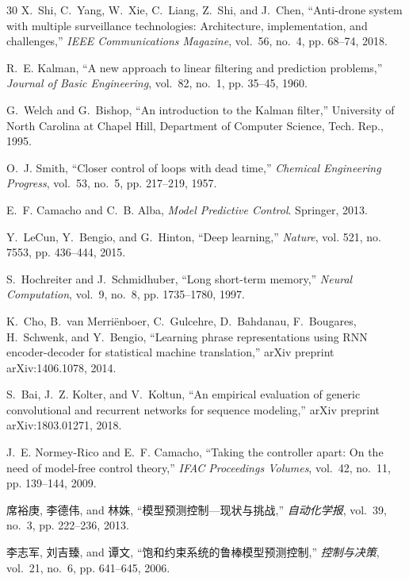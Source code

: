 \documentclass[journal]{IEEEtran}
\begin{document}
\begin{thebibliography}{30}
X.~Shi, C.~Yang, W.~Xie, C.~Liang, Z.~Shi, and J.~Chen, ``Anti-drone system with multiple surveillance technologies: Architecture, implementation, and challenges,'' \emph{IEEE Communications Magazine}, vol.~56, no.~4, pp. 68--74, 2018.

R.~E. Kalman, ``A new approach to linear filtering and prediction problems,'' \emph{Journal of Basic Engineering}, vol.~82, no.~1, pp. 35--45, 1960.

G.~Welch and G.~Bishop, ``An introduction to the Kalman filter,'' University of North Carolina at Chapel Hill, Department of Computer Science, Tech. Rep., 1995.

O.~J. Smith, ``Closer control of loops with dead time,'' \emph{Chemical Engineering Progress}, vol.~53, no.~5, pp. 217--219, 1957.

E.~F. Camacho and C.~B. Alba, \emph{Model Predictive Control}. Springer, 2013.

Y.~LeCun, Y.~Bengio, and G.~Hinton, ``Deep learning,'' \emph{Nature}, vol. 521, no. 7553, pp. 436--444, 2015.

S.~Hochreiter and J.~Schmidhuber, ``Long short-term memory,'' \emph{Neural Computation}, vol.~9, no.~8, pp. 1735--1780, 1997.

K.~Cho, B.~van Merriënboer, C.~Gulcehre, D.~Bahdanau, F.~Bougares, H.~Schwenk, and Y.~Bengio, ``Learning phrase representations using RNN encoder-decoder for statistical machine translation,'' arXiv preprint arXiv:1406.1078, 2014.

S.~Bai, J.~Z. Kolter, and V.~Koltun, ``An empirical evaluation of generic convolutional and recurrent networks for sequence modeling,'' arXiv preprint arXiv:1803.01271, 2018.

J.~E. Normey-Rico and E.~F. Camacho, ``Taking the controller apart: On the need of model-free control theory,'' \emph{IFAC Proceedings Volumes}, vol.~42, no.~11, pp. 139--144, 2009.

席裕庚, 李德伟, and 林姝, ``模型预测控制---现状与挑战,'' \emph{自动化学报}, vol.~39, no.~3, pp. 222--236, 2013.

李志军, 刘吉臻, and 谭文, ``饱和约束系统的鲁棒模型预测控制,'' \emph{控制与决策}, vol.~21, no.~6, pp. 641--645, 2006.


\end{thebibliography}
\end{document}
